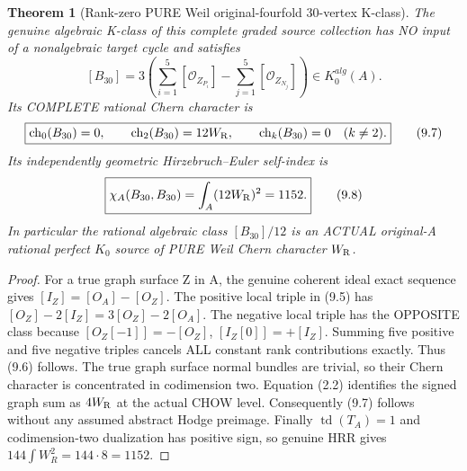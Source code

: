 \documentclass[11pt,a4paper]{article}
\newcommand{\ch}{\operatorname{ch}}
\newtheorem{theorem}{Theorem}[section]
\begin{document}
\begin{theorem}[Rank-zero PURE Weil original-fourfold 30-vertex K-class]
The genuine algebraic
K-class of this
complete graded
source collection has
NO input of a
nonalgebraic target
cycle and satisfies
\[
 \boxed{
 [B_{30}]=
 3\left(
    \sum_{i=1}^{5}
        [\mathcal O_{Z_{P_i}}]
   -\sum_{j=1}^{5}
        [\mathcal O_{Z_{N_j}}]\right)
     \in K_0^{alg}(A).
 }                                                       \tag{9.6}
\]
Its COMPLETE rational
Chern character is
\[
 \boxed{
  \ch_0(B_{30})=0,\qquad
  \ch_2(B_{30})=12W_{\rm R},\qquad
  \ch_k(B_{30})=0\quad(k\ne2).
 }                                                       \tag{9.7}
\]
Its independently
geometric Hirzebruch--Euler
self-index is
\[
 \boxed{
  \chi_A(B_{30},B_{30})
       =\int_A(12W_{\rm R})^2=1152.
 }                                                       \tag{9.8}
\]
In particular the
rational algebraic
class \([B_{30}]/12\)
is an ACTUAL
original-A rational
perfect \(K_0\) source
of PURE Weil Chern
character \(W_{\rm R}\).
\end{theorem}
\begin{proof}
For a true graph
surface Z in A,
the genuine coherent
ideal exact sequence
gives
\(
[I_Z]=[O_A]-[O_Z]
\).
The positive local
triple in (9.5)
has
\(
[O_Z]-2[I_Z]
 =3[O_Z]-2[O_A]
\).
The negative local
triple has the
OPPOSITE class
because
\([O_Z[-1]]=-[O_Z]\),
\([I_Z[0]]=+[I_Z]\).
Summing five positive
and five negative
triples cancels ALL
constant rank
contributions exactly.
Thus (9.6) follows.
The true graph surface
normal bundles are
trivial, so their
Chern character is
concentrated in
codimension two.
Equation (2.2)
identifies the
signed graph sum as
\(4W_{\rm R}\)
at the actual CHOW
level. Consequently
(9.7) follows
without any assumed
abstract Hodge preimage.
Finally
\(
\operatorname{td}(T_A)=1
\)
and codimension-two
dualization has
positive sign, so
genuine HRR gives
\(144\int W_R^2
 =144\cdot8=1152\).
\end{proof}
\end{document}
